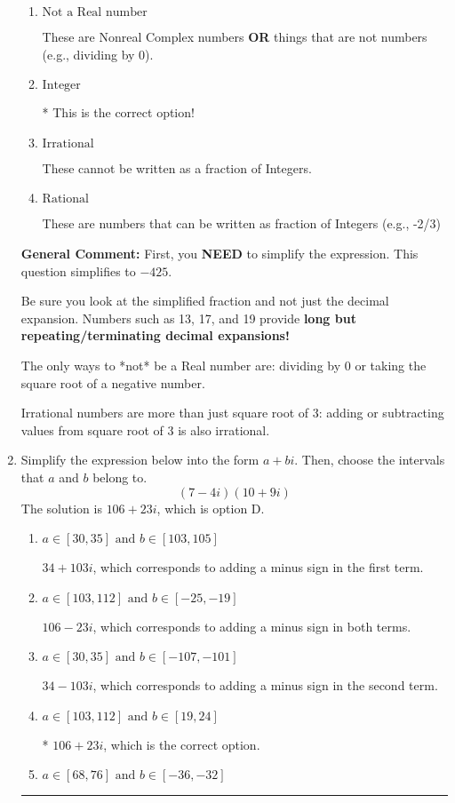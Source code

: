 \documentclass{extbook}[14pt]
\newcommand{\litem}[1]{\item #1

\rule{\textwidth}{0.4pt}}
\begin{document}
\begin{enumerate}
{\begin{enumerate}[label=\Alph*.]
These are the counting numbers with 0 (0, 1, 2, 3, ...)
\item \( \text{Not a Real number} \)

These are Nonreal Complex numbers \textbf{OR} things that are not numbers (e.g., dividing by 0).
\item \( \text{Integer} \)

* This is the correct option!
\item \( \text{Irrational} \)

These cannot be written as a fraction of Integers.
\item \( \text{Rational} \)

These are numbers that can be written as fraction of Integers (e.g., -2/3)
\end{enumerate}

\textbf{General Comment:} First, you \textbf{NEED} to simplify the expression. This question simplifies to $-425$. 
 
 Be sure you look at the simplified fraction and not just the decimal expansion. Numbers such as 13, 17, and 19 provide \textbf{long but repeating/terminating decimal expansions!} 
 
 The only ways to *not* be a Real number are: dividing by 0 or taking the square root of a negative number. 
 
 Irrational numbers are more than just square root of 3: adding or subtracting values from square root of 3 is also irrational.
}
\litem{
Simplify the expression below into the form $a+bi$. Then, choose the intervals that $a$ and $b$ belong to.
\[ (7 - 4 i)(10 + 9 i) \]The solution is \( 106 + 23 i \), which is option D.\begin{enumerate}[label=\Alph*.]
\item \( a \in [30, 35] \text{ and } b \in [103, 105] \)

 $34 + 103 i$, which corresponds to adding a minus sign in the first term.
\item \( a \in [103, 112] \text{ and } b \in [-25, -19] \)

 $106 - 23 i$, which corresponds to adding a minus sign in both terms.
\item \( a \in [30, 35] \text{ and } b \in [-107, -101] \)

 $34 - 103 i$, which corresponds to adding a minus sign in the second term.
\item \( a \in [103, 112] \text{ and } b \in [19, 24] \)

* $106 + 23 i$, which is the correct option.
\item \( a \in [68, 76] \text{ and } b \in [-36, -32] \)


\end{enumerate}}
\end{enumerate}
\end{document}
